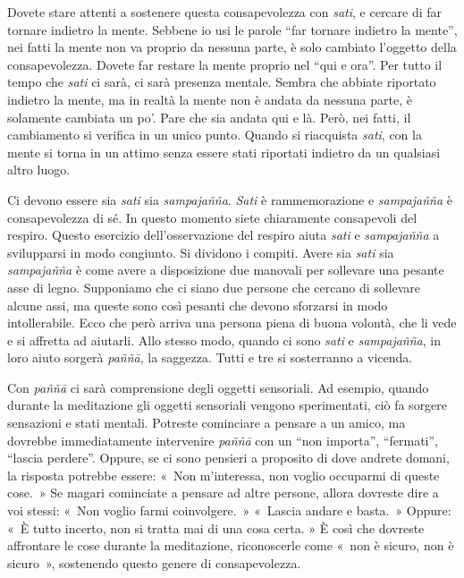 Dovete stare attenti a sostenere questa consapevolezza con \emph{sati},
e cercare di far tornare indietro la mente. Sebbene io usi le parole
``far tornare indietro la mente'', nei fatti la mente non va proprio da
nessuna parte, è solo cambiato l'oggetto della consapevolezza. Dovete
far restare la mente proprio nel ``qui e ora''. Per tutto il tempo che
\emph{sati} ci sarà, ci sarà presenza mentale. Sembra che abbiate
riportato indietro la mente, ma in realtà la mente non è andata da
nessuna parte, è solamente cambiata un po'. Pare che sia andata qui e
là. Però, nei fatti, il cambiamento si verifica in un unico punto.
Quando si riacquista \emph{sati}, con la mente si torna in un attimo
senza essere stati riportati indietro da un qualsiasi altro luogo.

Ci devono essere sia \emph{sati} sia \emph{sampajañña}. \emph{Sati} è
rammemorazione e \emph{sampajañña} è consapevolezza di sé. In questo
momento siete chiaramente consapevoli del respiro. Questo esercizio
dell'osservazione del respiro aiuta \emph{sati} e \emph{sampajañña} a
svilupparsi in modo congiunto. Si dividono i compiti. Avere sia
\emph{sati} sia \emph{sampajañña} è come avere a disposizione due
manovali per sollevare una pesante asse di legno. Supponiamo che ci
siano due persone che cercano di sollevare alcune assi, ma queste sono
così pesanti che devono sforzarsi in modo intollerabile. Ecco che però
arriva una persona piena di buona volontà, che li vede e si affretta ad
aiutarli. Allo stesso modo, quando ci sono \emph{sati} e
\emph{sampajañña}, in loro aiuto sorgerà \emph{paññā}, la saggezza.
Tutti e tre si sosterranno a vicenda.

Con \emph{paññā} ci sarà comprensione degli oggetti sensoriali. Ad
esempio, quando durante la meditazione gli oggetti sensoriali vengono
sperimentati, ciò fa sorgere sensazioni e stati mentali. Potreste
cominciare a pensare a un amico, ma dovrebbe immediatamente intervenire
\emph{paññā} con un ``non importa'', ``fermati'', ``lascia perdere''.
Oppure, se ci sono pensieri a proposito di dove andrete domani, la
risposta potrebbe essere: «~Non m'interessa, non voglio occuparmi di
queste cose.~» Se magari cominciate a pensare ad altre persone, allora
dovreste dire a voi stessi: «~Non voglio farmi coinvolgere.~» «~Lascia
andare e basta.~» Oppure: «~È tutto incerto, non si tratta mai di una
cosa certa. » È così che dovreste affrontare le cose durante la
meditazione, riconoscerle come «~non è sicuro, non è sicuro~»,
sostenendo questo genere di consapevolezza.

